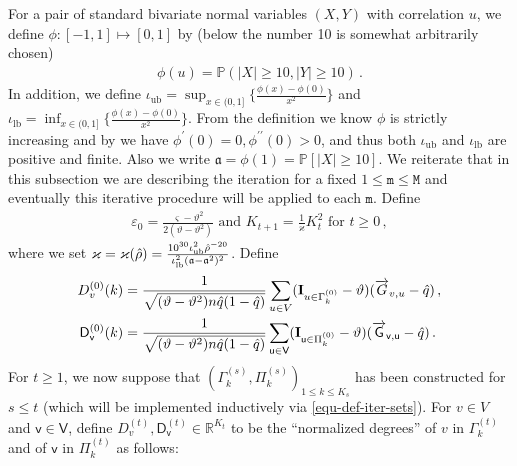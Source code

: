 \documentclass[11pt]{article}
\numberwithin{equation}{section}
\begin{document}
For a pair of standard bivariate normal variables $(X, Y)$ with correlation $u$, we define $\phi: [-1, 1] \mapsto [0, 1]$ by (below the number 10 is somewhat arbitrarily chosen)
\begin{align}
    \phi(u) = \mathbb{P} (|X| \geq 10 ,|Y| \geq 10) \,.
    \label{equ-def-func-phi}
\end{align}
In addition, we define $\iota_{\mathrm{ub}} = \sup_{x \in (0,1]} \big\{ \frac{\phi(x)-\phi(0)}{x^2} \big\}$ and $\iota_{\mathrm{lb}} = \inf_{x \in (0,1]} \big\{ \frac{\phi(x)-\phi(0)}{x^2} \big\}$. From the definition we know $\phi$ is strictly increasing and by \cite[Claims 2.6 and 2.8]{DL22+} we have $\phi^{\prime} (0) =0, \phi^{\prime \prime} (0) >0$, and thus both $\iota_{\mathrm{ub}}$ and $\iota_{\mathrm{lb}}$ are positive and finite. Also we write $\mathfrak{a}=\phi(1) = \mathbb{P}[|X| \geq 10]$. We reiterate that in this subsection we are describing the iteration for a fixed $1 \leq \mathtt m \leq \mathtt M$ and eventually this iterative procedure will be applied to each $\mathtt m$. Define
\begin{align}
    \varepsilon_{0} = \frac{\varsigma-\vartheta^2} {2(\vartheta-\vartheta^2)} \mbox{ and } K_{t+1} = \frac{1}{ \varkappa } K_{t}^{2} \mbox{ for } t \geq 0 \,,
    \label{equ-def-iter-K}
\end{align}
where we set $\varkappa = \varkappa(\Hat{\rho}) =  \frac{10^{30} \iota_{\mathrm{ub}}^2 \Hat{\rho}^{-20}}{\iota_{\mathrm{lb}}^2 (\mathfrak{a}- \mathfrak{a}^2)^2}$.
Define
\begin{equation}
    \begin{aligned}
        D^{(0)}_v(k) &= \frac{1}{  \sqrt{(\vartheta- \vartheta^2) n \Hat{q}(1-\Hat{q}) }} \sum_{u \in V }( \mathbf{I}_{u \in \Gamma^{(0)}_k} - \vartheta) (\overrightarrow{G}_{v,u}-\Hat{q}) \,, \\
        \mathsf{D}^{(0)}_{\mathsf{v}}(k) &= \frac{1}{  \sqrt{ (\vartheta-\vartheta^2) n \Hat{q}(1-\Hat{q}) }} \sum_{\mathsf{u} \in \mathsf{V} }(\mathbf{I}_{\mathsf{u} \in \Pi^{(0)}_k} - \vartheta) (\overrightarrow{\mathsf{G}}_{\mathsf{v,u}}- \Hat{q})\,.
        \label{equ-def-degree-1}
    \end{aligned}
\end{equation}
For $t\geq 1$, we now suppose that $( \Gamma^{(s)}_k,\Pi^{(s)}_k)_{1 \leq k \leq K_s}$ has been constructed for $s \leq t$ (which will be implemented inductively via \eqref{equ-def-iter-sets}). For $v \in V$ and $\mathsf{v} \in \mathsf{V} $,  define $D^{(t)}_v, \mathsf{D}^{(t)}_{\mathsf{v}} \in \mathbb{R}^{K_t}$ to be the ``normalized degrees'' of $v$ in $\Gamma^{(t)}_k$ and of $\mathsf{v}$ in $\Pi^{(t)}_k$ as follows:
\end{document}
